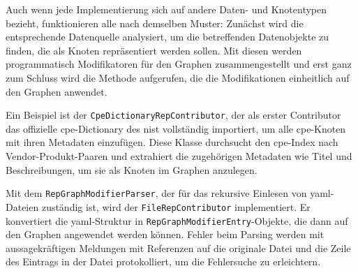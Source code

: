 Auch wenn jede Implementierung sich auf andere Daten- und Knotentypen bezieht, funktionieren alle nach demselben Muster:
Zunächst wird die entsprechende Datenquelle analysiert, um die betreffenden Datenobjekte zu finden, die als Knoten repräsentiert werden sollen.
Mit diesen werden programmatisch Modifikatoren für den Graphen zusammengestellt und erst ganz zum Schluss wird die Methode aufgerufen, die die Modifikationen einheitlich auf den Graphen anwendet.

Ein Beispiel ist der \texttt{CpeDictionaryRepContributor}, der als erster Contributor das offizielle \acrshort{cpe}-Dictionary des \acrshort{nist} vollständig importiert, um alle \acrshort{cpe}-Knoten mit ihren Metadaten einzufügen.
Diese Klasse durchsucht den \acrshort{cpe}-Index nach Vendor-Produkt-Paaren und extrahiert die zugehörigen Metadaten wie Titel und Beschreibungen, um sie als Knoten im Graphen anzulegen.

Mit dem \texttt{RepGraphModifierParser}, der für das rekursive Einlesen von \acrshort{yaml}-Dateien zuständig ist, wird der \texttt{FileRepContributor} implementiert.
Er konvertiert die \acrshort{yaml}-Struktur in \texttt{RepGraphModifierEntry}-Objekte, die dann auf den Graphen angewendet werden können.
Fehler beim Parsing werden mit aussagekräftigen Meldungen mit Referenzen auf die originale Datei und die Zeile des Eintrags in der Datei protokolliert, um die Fehlersuche zu erleichtern.
